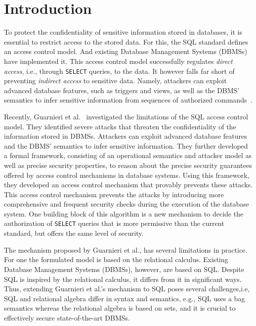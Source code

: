 \section{Introduction}
To protect the confidentiality of sensitive information stored in databases, it is essential to restrict access to the stored data.
%
For this, the SQL standard defines an access control model. And existing Database Management Systems (DBMSs) have implemented it. 
%
This access control model successfully regulates \emph{direct access}, i.e., through \texttt{SELECT} queries, to the data. It however falls far short of preventing \emph{indirect access} to sensitive data.
%
Namely, attackers can exploit advanced database features, such as triggers and views, as well as the DBMS' semantics to infer sensitive information from sequences of authorized commands~\cite{guarnieri2016strong}.
%

Recently, Guarnieri et al.~\cite{guarnieri2016strong} investigated the limitations of the SQL access control model. 
%
They identified severe attacks that threaten the confidentiality of the information stored in DBMSs. Attackers can exploit advanced database features and the DBMS' semantics to infer sensitive information.
%
They further developed a formal framework, consisting of an operational semantics and attacker model as well as precise security properties, to reason about the precise security guarantees offered by access control mechanisms in database systems.
%
Using this framework, they developed an access control mechanism that provably prevents these attacks.
%
This access control mechanism prevents the attacks by introducing more comprehensive and frequent security checks during the execution of the database system.
%
One building block of this algorithm is a new mechanism to decide the authorization of \texttt{SELECT} queries that is more permissive than the current standard, but offers the same level of security.

The mechanism proposed by Guarnieri et al., has several limitations in practice.
%
For one the formulated model is based on the relational calculus. 
%
Existing Database Management Systems (DBMSs), however, are based on SQL.
%
Despite SQL is inspired by the relational calculus, it differs from it in significant ways.
%
Thus, extending Guarnieri et al.'s mechanism to SQL poses several challenges,i.e, SQL and relational algebra differ in syntax and semantics, e.g., SQL uses a bag semantics whereas the relational algebra is based on sets, and it is crucial to effectively secure state-of-the-art DBMSs.

